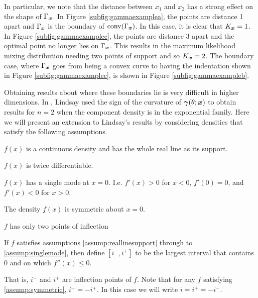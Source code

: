		In particular, we note that the distance between $x_1$ and $x_2$ has a strong effect on the shape of $\Gamma_{\bm{{x}}}$. In Figure \ref{subfig:gammaexamplea}, the points are distance 1 apart and $\Gamma_{\bm{{x}}}$ is the boundary of $\mathrm{conv}(\Gamma_{\bm{{x}}})$. In this case, it is clear that $K_{\bm{{x}}} = 1$. In Figure \ref{subfig:gammaexamplec}, the points are distance 3 apart and the optimal point no longer lies on $\Gamma_{\bm{{x}}}$. This results in the maximum likelihood mixing distribution needing two points of support and so $K_{\bm{{x}}} = 2$. The boundary case, where $\Gamma_{\bm{{x}}}$ goes from being a convex curve to having the indentation shown in Figure \ref{subfig:gammaexamplec}, is shown in Figure \ref{subfig:gammaexampleb}.

		Obtaining results about where these boundaries lie is very difficult in higher dimensions. In \cite{Lindsay1983a-he}, Lindsay used the sign of the curvature of ${\bm{{\gamma}}}(\theta;{\bm{{x}}})$ to obtain results for $n=2$ when the component density is in the exponential family. Here we will present an extension to Lindsay's results by considering densities that satisfy the following assumptions.
	
		\begin{assumption}[Continuity]
			$f(x)$ is a continuous density and has the whole real line as its support.
			\label{assump:reallinesupport}
		\end{assumption}
		
		\begin{assumption}[Differentiability]
			$f(x)$ is twice differentiable.
			\label{assump:twicediff}
		\end{assumption}
		
		\begin{assumption}[Unimodality]
			$f(x)$ has a single mode at $x=0$. I.e. $f'(x) > 0$ for $x <0$, $f'(0) = 0$, and $f'(x) < 0$ for $x>0$.
			\label{assump:singlemode}
		\end{assumption}
		
		\begin{assumption}[Symmetry]
			The density $f(x)$ is symmetric about $x = 0$.
			\label{assump:symmetric}
		\end{assumption}
		
		\begin{assumption}
			$f$ has only two points of inflection
			\label{assump:twoinflectionpoints}
		\end{assumption}
		
		\begin{definition}
			If $f$ satisfies assumptions \ref{assump:reallinesupport} through to \ref{assump:singlemode}, then define $[i^-,i^+]$ to be the largest interval that contains 0 and on which $f''(x) \leq 0$.
			\label{def:i-i+}
		\end{definition}
		That is, $i^-$ and $i^+$ are inflection points of $f$. Note that for any $f$ satisfying \ref{assump:symmetric}, $i^- = -i^+$. In this case we will write $i = i^+ = -i^-$.
		
